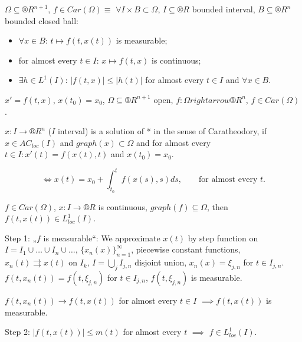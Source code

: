 \documentclass[12pt]{article}					%
\begin{document}
\begin{definice}
	$\Omega \subseteq ®R^{n+1}$, $f \in Car(\Omega) ≡$ $\forall I \times B \subset \Omega$, $I \subseteq ®R$ bounded interval, $B \subseteq ®R^n$ bounded closed ball:
	\begin{itemize}
		\item $\forall x \in B$: $t \mapsto f(t, x(t))$ is measurable;
		\item for almost every $t \in I$: $x \mapsto f(t, x)$ is continuous;
		\item $\exists h \in L^1(I)$: $|f(t, x)| ≤ |h(t)|$ for almost every $t \in I$ and $\forall x \in B$.
	\end{itemize}
\end{definice}


\begin{definice}[*]
	$x' = f(t, x)$, $x(t_0) = x_0$, $\Omega \subseteq ®R^{n+1}$ open, $f: \Omega rightarrow ®R^n$, $f \in Car(\Omega)$.
\end{definice}

\begin{definice}
	$x: I \rightarrow ®R^n$ ($I$ interval) is a solution of * in the sense of Caratheodory, if $x \in AC_{loc}(I)$ and $graph(x) \subset \Omega$ and for almost every $t \in I: x'(t) = f(x(t), t)$ and $x(t_0) = x_0$.

	\begin{poznamka}
		$$ \Leftrightarrow x(t) = x_0 + \int_{t_0}^t f(x(s), s) ds, \qquad \text{for almost every } t. $$
	\end{poznamka}
\end{definice}

\begin{lemma}
	$f \in Car(\Omega)$, $x: I \rightarrow ®R$ is continuous, $graph(f) \subseteq \Omega$, then $f(t, x(t)) \in L_{loc}^1(I)$.

	\begin{dukazin}
		Step 1: „$f$ is measurable“: We approximate $x(t)$ by step function on $I = I_1 \cup … \cup I_n \cup …$, $\{x_n(x)\}_{n=1}^∞$, piecewise constant functions, $x_n(t) \rightrightarrows x(t)$ on $I_k$, $I = \bigcup_j I_{j, n}$ disjoint union, $x_n(x) = \xi_{j, n}$ for $t \in I_{j, n}$. $f(t, x_n(t)) = f(t, \xi_{j, n})$ for $t \in I_{j, n}$, $f(t, \xi_{j, n})$ is measurable.

		$f(t, x_n(t)) \rightarrow f(t, x(t))$ for almost every $t \in I$ $\implies f(t, x(t))$ is measurable.

		Step 2: $|f(t, x(t))| ≤ m(t)$ for almost every $t$ $\implies$ $f \in L_{loc}^1(I)$.
	\end{dukazin}
\end{lemma}
\end{document}
